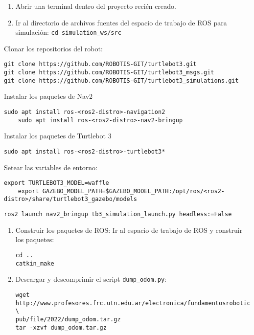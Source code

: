 \documentclass[tp]{lcc}
\begin{document}
\begin{enumerate}
	\item Abrir una terminal dentro del proyecto recién creado.

	\item Ir al directorio de archivos fuentes del espacio de trabajo de ROS para simulación: \lstinline[style=bash]{cd simulation_ws/src}
\end{enumerate}

Clonar los repositorios del robot:
\begin{lstlisting}[style=bash] 
git clone https://github.com/ROBOTIS-GIT/turtlebot3.git
git clone https://github.com/ROBOTIS-GIT/turtlebot3_msgs.git
git clone https://github.com/ROBOTIS-GIT/turtlebot3_simulations.git
\end{lstlisting}

Instalar los paquetes de Nav2 
\begin{lstlisting}[style=bash] 
	sudo apt install ros-<ros2-distro>-navigation2
	sudo apt install ros-<ros2-distro>-nav2-bringup
\end{lstlisting}

Instalar los paquetes de Turtlebot 3
\begin{lstlisting}[style=bash] 
	sudo apt install ros-<ros2-distro>-turtlebot3*
\end{lstlisting}

Setear las variables de entorno:
\begin{lstlisting}[style=bash] 
	export TURTLEBOT3_MODEL=waffle
	export GAZEBO_MODEL_PATH=$GAZEBO_MODEL_PATH:/opt/ros/<ros2-distro>/share/turtlebot3_gazebo/models
\end{lstlisting}

\begin{lstlisting}[style=bash] 
	ros2 launch nav2_bringup tb3_simulation_launch.py headless:=False
\end{lstlisting}


\begin{enumerate}
	\item Construir los paquetes de ROS: Ir al espacio de trabajo de ROS y construir los paquetes:

\begin{lstlisting}[style=bash] 
cd ..
catkin_make
\end{lstlisting}
	
	\item Descargar y descomprimir el script \lstinline[style=bash]{dump_odom.py}:
	
\begin{lstlisting}[style=bash] 
wget http://www.profesores.frc.utn.edu.ar/electronica/fundamentosroboticamovil/ \
pub/file/2022/dump_odom.tar.gz
tar -xzvf dump_odom.tar.gz
\end{lstlisting}
	
\end{enumerate}
\end{document}

